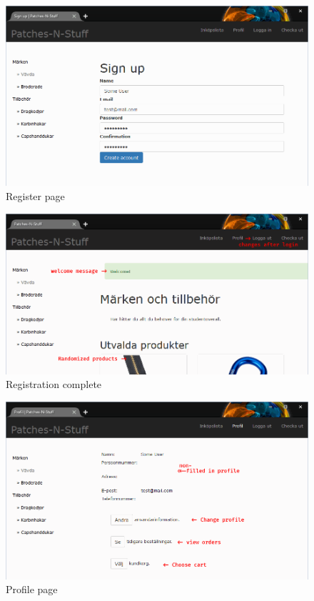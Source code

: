 \documentclass[paper=a4, fontsize=11pt]{report} %
\begin{document}
\begin{figure}
	\includegraphics[width=0.9\paperwidth]{artifacts/stories/3_register.png}
	\caption{Register page}
	\label{fig:register}
\end{figure}

\begin{figure}
	\includegraphics[width=0.9\paperwidth]{artifacts/stories/4_register_done.png}
	\caption{Registration complete}
	\label{fig:register_done}
\end{figure}

\begin{figure}
	\includegraphics[width=0.9\paperwidth]{artifacts/stories/5_profile.png}
	\caption{Profile page}
	\label{fig:profile}
\end{figure}
\end{document}
